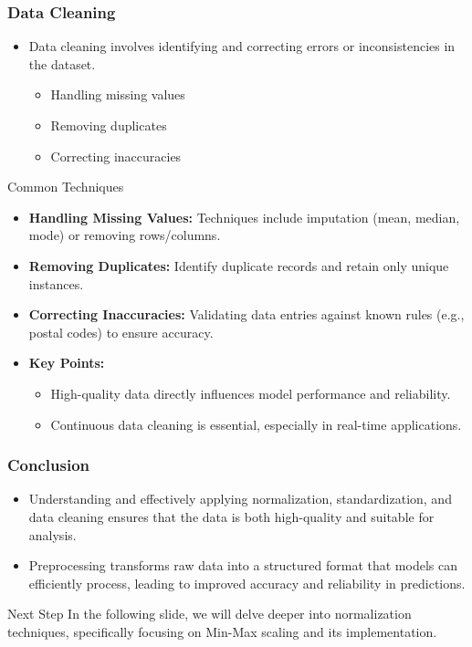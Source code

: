 \documentclass[aspectratio=169]{beamer}
\begin{document}
\begin{frame}[fragile]
    \frametitle{Data Cleaning}
    \begin{itemize}
        \item Data cleaning involves identifying and correcting errors or inconsistencies in the dataset.
        \begin{itemize}
            \item Handling missing values
            \item Removing duplicates
            \item Correcting inaccuracies
        \end{itemize}
    \end{itemize}
    
    \begin{block}{Common Techniques}
        \begin{itemize}
            \item \textbf{Handling Missing Values:} Techniques include imputation (mean, median, mode) or removing rows/columns.
            \item \textbf{Removing Duplicates:} Identify duplicate records and retain only unique instances.
            \item \textbf{Correcting Inaccuracies:} Validating data entries against known rules (e.g., postal codes) to ensure accuracy.
        \end{itemize}
    \end{block}
    
    \begin{itemize}
        \item \textbf{Key Points:}
        \begin{itemize}
            \item High-quality data directly influences model performance and reliability.
            \item Continuous data cleaning is essential, especially in real-time applications.
        \end{itemize}
    \end{itemize}
\end{frame}

\begin{frame}[fragile]
    \frametitle{Conclusion}
    \begin{itemize}
        \item Understanding and effectively applying normalization, standardization, and data cleaning ensures that the data is both high-quality and suitable for analysis.
        \item Preprocessing transforms raw data into a structured format that models can efficiently process, leading to improved accuracy and reliability in predictions.
    \end{itemize}
    
    \begin{block}{Next Step}
        In the following slide, we will delve deeper into normalization techniques, specifically focusing on Min-Max scaling and its implementation.
    \end{block}
\end{frame}
\end{document}
